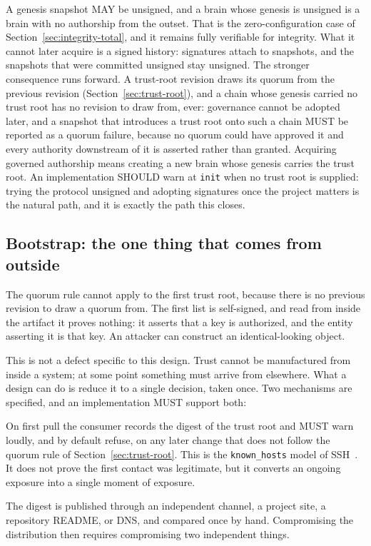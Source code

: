 \documentclass[11pt,a4paper]{article}
\begin{document}
A genesis snapshot MAY be unsigned, and a brain whose genesis is unsigned is a
brain with no authorship from the outset. That is the zero-configuration case of
Section~\ref{sec:integrity-total}, and it remains fully verifiable for integrity.
What it cannot later acquire is a signed history: signatures attach to
snapshots, and the snapshots that were committed unsigned stay unsigned. The
stronger consequence runs forward. A trust-root revision draws its quorum from
the previous revision (Section~\ref{sec:trust-root}), and a chain whose
genesis carried no trust root has no revision to draw from, ever: governance
cannot be adopted later, and a snapshot that introduces a trust root onto such
a chain MUST be reported as a quorum failure, because no quorum could have
approved it and every authority downstream of it is asserted rather than
granted. Acquiring governed authorship means creating a new brain whose
genesis carries the trust root. An implementation SHOULD warn at \texttt{init}
when no trust root is supplied: trying the protocol unsigned and adopting
signatures once the project matters is the natural path, and it is exactly the
path this closes.

\subsection{Bootstrap: the one thing that comes from outside}
\label{sec:bootstrap}

The quorum rule cannot apply to the first trust root, because there is no
previous revision to draw a quorum from. The first list is self-signed, and read
from inside the artifact it proves nothing: it asserts that a key is authorized,
and the entity asserting it is that key. An attacker can construct an
identical-looking object.

This is not a defect specific to this design. Trust cannot be manufactured from
inside a system; at some point something must arrive from elsewhere. What a
design can do is reduce it to a single decision, taken once. Two mechanisms are
specified, and an implementation MUST support both:

\begin{description}[leftmargin=2.2em, style=sameline, font=\normalfont\bfseries]
  \item[Trust on first use, then pin.] On first pull the consumer records the
  digest of the trust root and MUST warn loudly, and by default refuse, on any
  later change that does not follow the quorum rule of
  Section~\ref{sec:trust-root}. This is the \texttt{known\_hosts} model of
  SSH~\cite{rfc4251}. It does not prove the first contact was legitimate, but it
  converts an ongoing exposure into a single moment of exposure.
  \item[Pin out of band.] The digest is published through an independent
  channel, a project site, a repository README, or DNS, and compared once by
  hand. Compromising the distribution then requires compromising two
  independent things.
\end{description}
\end{document}
